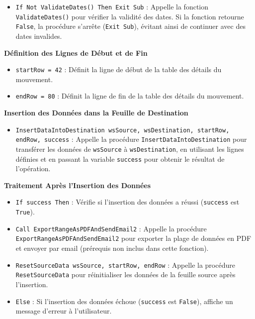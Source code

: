 \documentclass[a4paper, oneside, 12pt, final]{extreport}
\begin{document}
\begin{itemize}
    \item \texttt{If Not ValidateDates() Then Exit Sub} : Appelle la fonction \texttt{ValidateDates()} pour vérifier la validité des dates. Si la fonction retourne \texttt{False}, la procédure s'arrête (\texttt{Exit Sub}), évitant ainsi de continuer avec des dates invalides.
\end{itemize}

\textbf{Définition des Lignes de Début et de Fin}

\begin{itemize}
    \item \texttt{startRow = 42} : Définit la ligne de début de la table des détails du mouvement.
    \item \texttt{endRow = 80} : Définit la ligne de fin de la table des détails du mouvement.
\end{itemize}

\textbf{Insertion des Données dans la Feuille de Destination}

\begin{itemize}
    \item \texttt{InsertDataIntoDestination wsSource, wsDestination, startRow, endRow, success} : Appelle la procédure \texttt{InsertDataIntoDestination} pour transférer les données de \texttt{wsSource} à \texttt{wsDestination}, en utilisant les lignes définies et en passant la variable \texttt{success} pour obtenir le résultat de l'opération.
\end{itemize}

\textbf{Traitement Après l'Insertion des Données}

\begin{itemize}
    \item \texttt{If success Then} : Vérifie si l'insertion des données a réussi (\texttt{success} est \texttt{True}).
    \item \texttt{Call ExportRangeAsPDFAndSendEmail2} : Appelle la procédure \texttt{ExportRangeAsPDFAndSendEmail2} pour exporter la plage de données en PDF et envoyer par email (prérequis non inclus dans cette fonction).
    \item \texttt{ResetSourceData wsSource, startRow, endRow} : Appelle la procédure \texttt{ResetSourceData} pour réinitialiser les données de la feuille source après l'insertion.
    \item \texttt{Else} : Si l'insertion des données échoue (\texttt{success} est \texttt{False}), affiche un message d'erreur à l'utilisateur.
\end{itemize}
\end{document}
